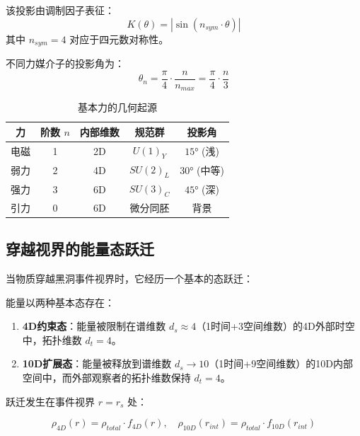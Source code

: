 该投影由调制因子表征：
\begin{equation}
    K(\theta) = |\sin(n_{sym} \cdot \theta)|
    \label{eq:kaleidoscope_factor}
\end{equation}
其中 $n_{sym} = 4$ 对应于四元数对称性。

不同力媒介子的投影角为：
\begin{equation}
    \theta_n = \frac{\pi}{4} \cdot \frac{n}{n_{max}} = \frac{\pi}{4} \cdot \frac{n}{3}
    \label{eq:projection_angles}
\end{equation}

\begin{table}[htbp]
\centering
\caption{基本力的几何起源}
\begin{tabular}{@{}ccccc@{}}
\hline
力 & 阶数 $n$ & 内部维数 & 规范群 & 投影角 \\
\hline
电磁 & 1 & 2D & $U(1)_Y$ & $15°$ (浅) \\
弱力 & 2 & 4D & $SU(2)_L$ & $30°$ (中等) \\
强力 & 3 & 6D & $SU(3)_C$ & $45°$ (深) \\
引力 & 0 & 6D & 微分同胚 & 背景 \\
\hline
\end{tabular}
\label{tab:force_origins}
\end{table}

\subsection{穿越视界的能量态跃迁}

当物质穿越黑洞事件视界时，它经历一个基本的态跃迁：

\begin{axiom}[能量态对偶性]
能量以两种基本态存在：
\begin{enumerate}
    \item \textbf{4D约束态}：能量被限制在谱维数 $d_s \approx 4$（1时间+3空间维数）的4D外部时空中，拓扑维数 $d_t = 4$。
    \item \textbf{10D扩展态}：能量被释放到谱维数 $d_s \to 10$（1时间+9空间维数）的10D内部空间中，而外部观察者的拓扑维数保持 $d_t = 4$。
\end{enumerate}
\end{axiom}

跃迁发生在事件视界 $r = r_s$ 处：

\begin{equation}
    \rho_{4D}(r) = \rho_{total} \cdot f_{4D}(r), \quad \rho_{10D}(r_{int}) = \rho_{total} \cdot f_{10D}(r_{int})
\end{equation}

